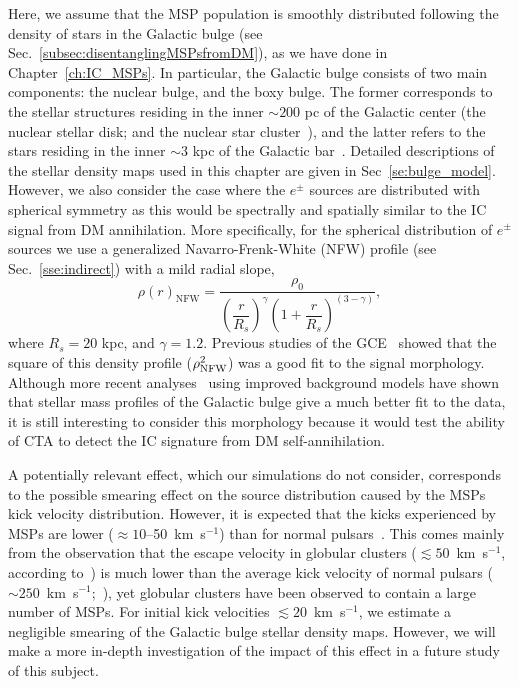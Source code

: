\documentclass[doublespace,nopageskip]{VTthesis}
\begin{document}
Here, we assume that the MSP population is smoothly distributed following the density of stars in the Galactic bulge (see Sec.~\ref{subsec:disentanglingMSPsfromDM}), as we have done in Chapter~\ref{ch:IC_MSPs}. In particular, the Galactic bulge consists of two main components: the nuclear bulge, and the boxy bulge. The former corresponds to the stellar structures residing in the inner $\sim 200$ pc of the Galactic center (the nuclear stellar disk; and the nuclear star cluster~\citealt{2002A&A...384..112L}), and the latter refers to the stars residing in the inner $\sim3$ kpc of the Galactic bar~\citep{1998ApJ...492..495F,2020MNRAS.495.3350C}. Detailed descriptions of the stellar density maps used in this chapter are given in Sec~\ref{se:bulge_model}. However, we also consider the case where the $e^\pm$ sources are distributed with spherical symmetry as this would be spectrally and spatially similar to the IC signal from DM annihilation. More specifically, for the spherical distribution of $e^\pm$ sources we use a generalized Navarro-Frenk-White (NFW) profile (see Sec.~\ref{sse:indirect}) with a mild radial slope,
\begin{equation}\label{eq:NFW}
  \rho(r)_\mathrm{NFW} = \dfrac{\rho_0}{\left(\dfrac{r}{R_s}\right)^\gamma\left(1+\dfrac{r}{R_s}\right)^{(3-\gamma)}},
\end{equation}
where $R_s=20$ kpc, and $\gamma=1.2$. Previous studies of the GCE~\citep{2012PhRvD..86h3511A,2013PhRvD..88h3521G,2016PDU....12....1D,2016ApJ...827..143C} showed that the square of this density profile ($\rho^2_{\rm NFW}$)  was a good fit to the signal morphology. Although more recent analyses~\citep{2018NatAs...2..387M,2018NatAs...2..819B,2019JCAP...09..042M,2020PhRvD.102d3012A} using improved background models have shown that stellar mass profiles of the Galactic bulge give a much better fit to the data, it is still interesting to consider this morphology because it  would test the ability of CTA to detect the IC signature from DM self-annihilation.


A potentially relevant effect, which our simulations do not consider, corresponds to the possible smearing effect on the source distribution caused by the MSPs kick velocity distribution. However, it is expected that the kicks experienced by MSPs are lower ($\approx 10$--50~km~s$^{-1}$) than for normal pulsars~\citep{2005ASPC..328..327P}. This comes mainly from the observation that the escape velocity in globular clusters ($\lesssim 50$~km~s$^{-1}$, according to~\citealt{2002ApJ...573..283P}) is much lower than the average kick velocity of normal pulsars ($\sim 250$~km~s$^{-1}$;~\citealt{2005MNRAS.360..974H,2019MNRAS.489.3116A}), yet globular clusters have been observed to contain a large number of MSPs. For initial kick velocities $\lesssim 20$~km~s$^{-1}$, we estimate a negligible smearing of the Galactic bulge stellar density maps. However, we will make a more in-depth investigation of the impact of this effect in a future study of this subject. 
\end{document}
